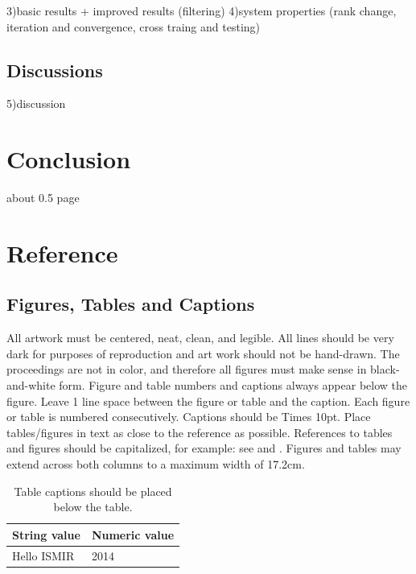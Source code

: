 \documentclass{article}
\begin{document}
3)basic results + improved results (filtering)
4)system properties (rank change, iteration and convergence, cross traing and testing)

\subsection{Discussions}\label{subsec:discussions}

5)discussion


\section{Conclusion}\label{sec:Conclusion}

about 0.5 page


\section{Reference}


\subsection{Figures, Tables and Captions}

All artwork must be centered, neat, clean, and legible.
All lines should be very dark for purposes of reproduction and art work should not be hand-drawn.
The proceedings are not in color, and therefore all figures must make sense in black-and-white form.
Figure and table numbers and captions always appear below the figure.
Leave 1 line space between the figure or table and the caption.
Each figure or table is numbered consecutively. Captions should be Times 10pt.
Place tables/figures in text as close to the reference as possible.
References to tables and figures should be capitalized, for example:
see  and .
Figures and tables may extend across both columns to a maximum width of 17.2cm.

\begin{table}
 \begin{center}
 \begin{tabular}{|l|l|}
  \hline
  String value & Numeric value \\
  \hline
  Hello ISMIR  & 2014 \\
  \hline
 \end{tabular}
\end{center}
 \caption{Table captions should be placed below the table.}
 \label{tab:example}
\end{table}
\end{document}
